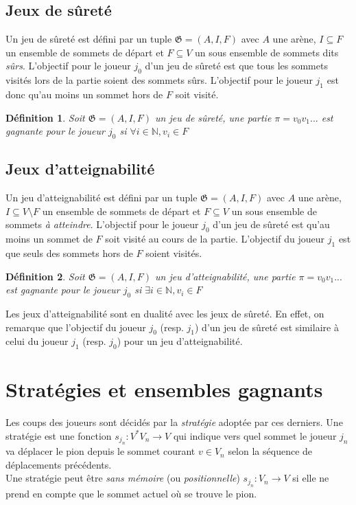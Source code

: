 \documentclass[12pt,a4paper,oneside,titlepage]{report}
\newtheorem{defi}{D\'efinition}[section]
\begin{document}
\subsection{Jeux de sûreté}
Un jeu de sûreté est défini par un tuple $\mathfrak{G}=(A,I,F)$ avec $A$ une arène, $I\subseteq F$ un ensemble de sommets de départ et $F\subseteq V$ un sous ensemble de sommets dits \emph{sûrs}. L'objectif pour le joueur $j_0$ d'un jeu de sûreté est que tous les sommets visités lors de la partie soient des sommets sûrs. L'objectif pour le joueur $j_1$ est donc qu'au moins un sommet hors de $F$ soit visité.
\begin{defi}
Soit $\mathfrak{G}=(A,I,F)$ un jeu de sûreté, une partie $\pi=v_0v_1...$ est gagnante pour le joueur $j_0$ si $\forall i\in \mathbb{N}, v_i \in F$
\end{defi}
\subsection{Jeux d'atteignabilité}
Un jeu d'atteignabilité est défini par un tuple $\mathfrak{G}=(A,I,F)$ avec $A$ une arène, $I\subseteq V\setminus F$ un ensemble de sommets de départ et $F\subseteq V$ un sous ensemble de sommets \emph{à atteindre}. L'objectif pour le joueur $j_0$ d'un jeu de sûreté est qu'au moins un sommet de $F$ soit visité au cours de la partie. L'objectif du joueur $j_1$ est que seuls des sommets hors de $F$ soient visités.
\begin{defi}
Soit $\mathfrak{G}=(A,I,F)$ un jeu d'atteignabilité, une partie $\pi=v_0v_1...$ est gagnante pour le joueur $j_0$ si $\exists i\in \mathbb{N}, v_i \in F$
\end{defi}
\noindent Les jeux d'atteignabilité sont en dualité avec les jeux de sûreté. En effet, on remarque que l'objectif du joueur $j_0$ (resp. $j_1$) d'un jeu de sûreté est similaire à celui du joueur $j_1$ (resp. $j_0$) pour un jeu d'atteignabilité.

\section{Stratégies et ensembles gagnants}
\noindent Les coups des joueurs sont décidés par la \emph{stratégie} adoptée par ces derniers. Une stratégie est une fonction $s_{j_n} : V^*V_n\to V$ qui indique vers quel sommet le joueur $j_n$ va déplacer le pion depuis le sommet courant $v\in V_n$ selon la séquence de déplacements précédents.\\
Une stratégie peut être \emph{sans mémoire} (ou \emph{positionnelle}) $s_{j_n} : V_n \to V$ si elle ne prend en compte que le sommet actuel où se trouve le pion.\\
\end{document}
